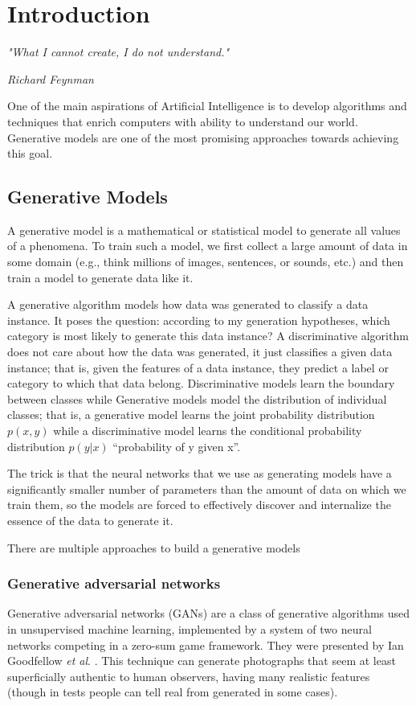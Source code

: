 \chapter{Introduction}\label{ch:introduction}

\epigraph{\normalsize\textit{ "What I cannot create, I do not understand."}}{\normalsize\textit{ Richard Feynman}}

One of the main aspirations of Artificial Intelligence is to develop algorithms and techniques that enrich computers with ability to understand our world. Generative models are one of the most promising approaches towards achieving this goal.\par\bigskip


\section{Generative Models}
\label{sec:gm}
A generative model is a mathematical or statistical model to generate all values of a phenomena. To train such a model, we first collect a large amount of data in some domain (e.g., think millions of images, sentences, or sounds, etc.) and then train a model to generate data like it.\par\bigskip
A generative algorithm models how data was generated to classify a data instance. It poses the question: according to my generation hypotheses, which category is most likely to generate this data instance? A discriminative algorithm does not care about how the data was generated, it just classifies a given data instance; that is, given the features of a data instance, they predict a label or category to which that data belong. Discriminative models learn the boundary between classes while Generative models model the distribution of individual classes; that is, a generative model learns the joint probability distribution $p(x,y)$ while a discriminative model learns the conditional probability distribution $p(y|x)$ “probability of y given x”.\par\bigskip
The trick is that the neural networks that we use as generating models have a significantly smaller number of parameters than the amount of data on which we train them, so the models are forced to effectively discover and internalize the essence of the data to generate it.\par\bigskip
\noindent There are multiple approaches to build a generative models
  \subsection{Generative adversarial networks}
  \label{sub:gans}
  Generative adversarial networks (GANs) are a class of generative algorithms used in unsupervised machine learning, implemented by a system of two neural networks competing in a zero-sum game framework. They were presented by Ian Goodfellow \textit{et al}. \cite{gan}. This technique can generate photographs that seem at least superficially authentic to human observers, having many realistic features (though in tests people can tell real from generated in some cases).
